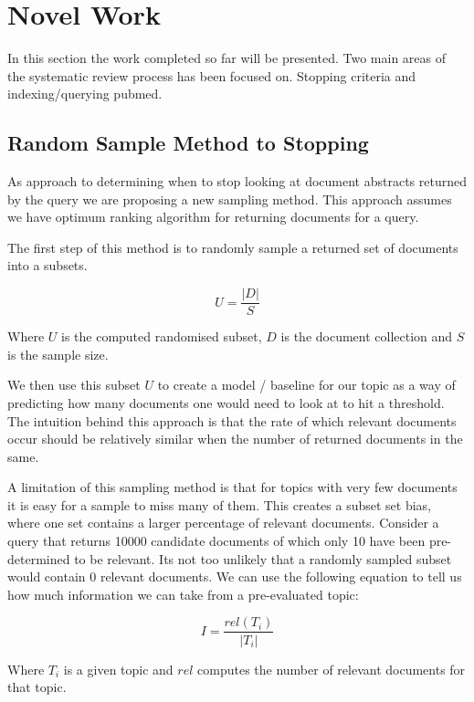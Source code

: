 \chapter{Novel Work}

In this section the work completed so far will be presented. Two main areas of the systematic review process has been focused on. Stopping criteria and indexing/querying pubmed.

\section{Random Sample Method to Stopping}

As approach to determining when to stop looking at document abstracts returned by the query we are proposing a new sampling method. This approach assumes we have optimum ranking algorithm for returning documents for a query.

The first step of this method is to randomly sample a returned set of documents into a subsets. 

\begin{equation}
U = \frac{|D|}{S}
\end{equation}

Where $U$ is the computed randomised subset, $D$ is the document collection and $S$ is the sample size.

We then use this subset $U$ to create a model / baseline for our topic as a way of predicting how many documents one would need to look at to hit a threshold. The intuition behind this approach is that the rate of which relevant documents occur should be relatively similar when the number of returned documents in the same.

A limitation of this sampling method is that for topics with very few documents it is easy for a sample to miss many of them. This creates a subset set bias, where one set contains a larger percentage of relevant documents. Consider a query that returns 10000 candidate documents of which only 10 have been pre-determined to be relevant. Its not too unlikely that a randomly sampled subset would contain 0 relevant documents. We can use the following equation to tell us how much information we can take from a pre-evaluated topic:

\begin{equation}
I = \frac{rel(T_i)}{|T_i|}
\end{equation}

Where $T_i$ is a given topic and $rel$ computes the number of relevant documents for that topic.


